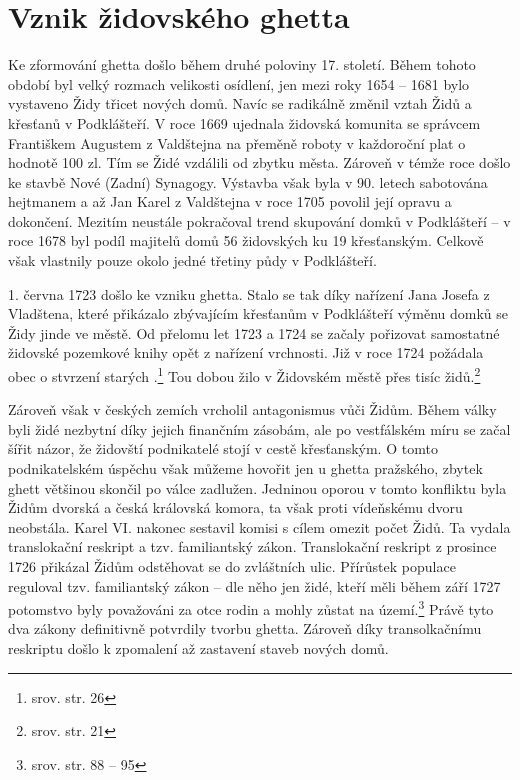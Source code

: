 \documentclass[a4paper,oneside,12pt]{report}
\begin{document}
\section{Vznik židovského ghetta}

Ke zformování ghetta došlo během druhé poloviny 17. století.
Během tohoto období byl velký rozmach velikosti osídlení, jen mezi roky 1654 -- 1681 bylo vystaveno Židy třicet nových domů.
Navíc se radikálně změnil vztah Židů a křesťanů v Podklášteří.
V roce 1669 ujednala židovská komunita se správcem Františkem Augustem z Valdštejna na přeměně roboty v každoroční plat o hodnotě 100 zl.
Tím se Židé vzdálili od zbytku města.
Zároveň v témže roce došlo ke stavbě Nové (Zadní) Synagogy.
Výstavba však byla v 90. letech sabotována hejtmanem a až Jan Karel z Valdštejna v roce 1705 povolil její opravu a dokončení.
Mezitím neustále pokračoval trend skupování domků v Podklášteří -- v roce 1678 byl podíl majitelů domů 56 židovských ku 19 křesťanským.
Celkově však vlastnily pouze okolo jedné třetiny půdy v Podklášteří.

1. června 1723 došlo ke vzniku ghetta.
Stalo se tak díky nařízení Jana Josefa z Vladštena, které přikázalo zbývajícím křesťanům v Podklášteří výměnu domků se Židy jinde ve městě.
Od přelomu let 1723 a 1724 se začaly pořizovat samostatné židovské pozemkové knihy opět z nařízení vrchnosti.
Již v roce 1724 požádala obec o stvrzení starých .\footnote{srov. \cite{Fiser2005} str. 26}
Tou dobou žilo v Židovském městě přes tisíc židů.\footnote{srov.  str. 21}

Zároveň však v českých zemích vrcholil antagonismus vůči Židům.
Během války byli židé nezbytní díky jejich finančním zásobám, ale po vestfálském míru se začal šířit názor, že židovští podnikatelé stojí v cestě křesťanským.
O tomto podnikatelském úspěchu však můžeme hovořit jen u ghetta pražského, zbytek ghett většinou skončil po válce zadlužen.
Jedninou oporou v tomto konfliktu byla Židům dvorská a česká královská komora, ta však proti vídeňskému dvoru neobstála.
Karel VI. nakonec sestavil komisi s cílem omezit počet Židů.
Ta vydala translokační reskript a tzv. familiantský zákon.
Translokační reskript z prosince 1726 přikázal Židům odstěhovat se do zvláštních ulic.
Přírůstek populace reguloval tzv. familiantský zákon -- dle něho jen židé, kteří měli během září 1727 potomstvo byly považováni za otce rodin a mohly zůstat na území.\footnote{srov. \cite{Uhlir1978} str. 88 -- 95}
Právě tyto dva zákony definitivně potvrdily tvorbu ghetta.
Zároveň díky transolkačnímu reskriptu došlo k zpomalení až zastavení staveb nových domů.
\end{document}
